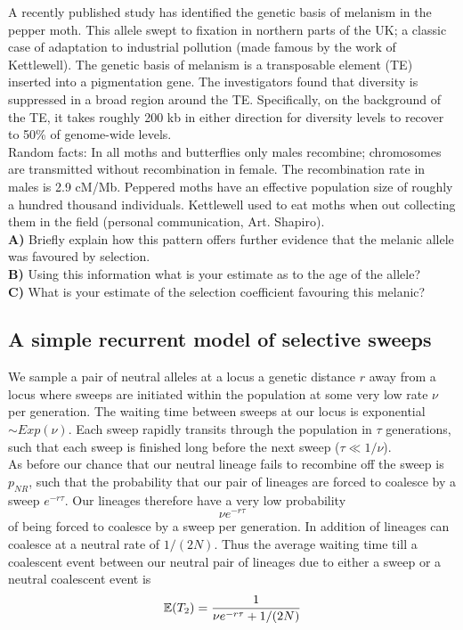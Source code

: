 \begin{question}
A recently published study has identified the genetic basis of
melanism in the pepper moth. This allele swept to fixation in northern
parts of the UK; a classic case of adaptation to industrial pollution
(made famous by the work of Kettlewell). The genetic basis of melanism
is a transposable element (TE) inserted into a pigmentation gene. The
investigators found that diversity is suppressed in a broad region
around the TE. Specifically, on the background of the TE, it takes
roughly 200 kb in either direction for diversity levels to recover to
50\% of genome-wide levels. \\

Random facts: In all moths and butterflies only males recombine;
chromosomes are transmitted without recombination in female. The
recombination rate in males is 2.9 cM/Mb.  Peppered moths have an
effective population size of roughly a hundred thousand
individuals. Kettlewell used to eat moths when out collecting them in
the field (personal communication, Art. Shapiro). \\
{\bf A)} Briefly explain how this pattern offers further evidence that the melanic allele was favoured by selection.\\
{\bf B)} Using this information what is your estimate as to the age of the allele?\\
{\bf C)} What is your estimate of the selection coefficient favouring this melanic?
\end{question}


\subsection{A simple recurrent model of selective sweeps}
We sample a pair of neutral alleles at a locus a genetic distance $r$ away from a locus where
sweeps are initiated within the population at some very low rate $\nu$
per generation. The waiting time between sweeps
at our locus is exponential $\sim Exp(\nu)$. Each sweep rapidly transits through the population in $\tau$
generations, such that each sweep is finished long before the next
sweep ($\tau \ll 1/\nu$). \\

As before our chance that our neutral lineage fails to recombine
off the sweep is $p_{NR}$, such that the probability that
our pair of lineages are forced to coalesce by a sweep $e^{-r \tau}$. Our
lineages therefore have a very low probability
\begin{equation}
\nu e^{-r \tau}
\end{equation}
of being forced to coalesce by a sweep per generation. In addition of
lineages can coalesce at a neutral rate of $1/(2N)$. Thus the average
waiting time till a coalescent event between our neutral pair of
lineages due to either a sweep or a neutral coalescent event is
\begin{equation}
\mathbb{E}(T_2) = \frac{1}{\nu e^{-r \tau} + 1/(2N)}
\end{equation}

